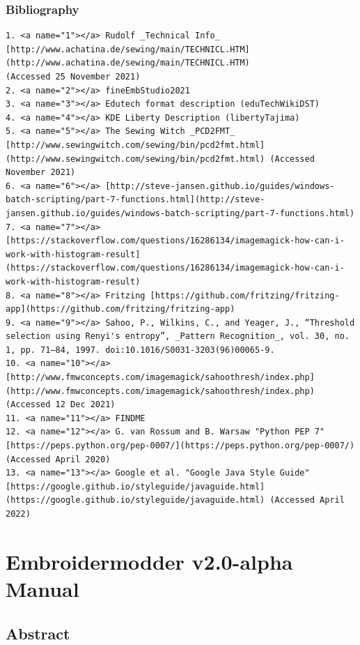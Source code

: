 \documentclass[a4paper, 11pt]{report}
\begin{document}
\subsection{Bibliography}

\begin{verbatim}
1. <a name="1"></a> Rudolf _Technical Info_ [http://www.achatina.de/sewing/main/TECHNICL.HTM](http://www.achatina.de/sewing/main/TECHNICL.HTM)
(Accessed 25 November 2021)
2. <a name="2"></a> fineEmbStudio2021
3. <a name="3"></a> Edutech format description (eduTechWikiDST)
4. <a name="4"></a> KDE Liberty Description (libertyTajima)
5. <a name="5"></a> The Sewing Witch _PCD2FMT_ [http://www.sewingwitch.com/sewing/bin/pcd2fmt.html](http://www.sewingwitch.com/sewing/bin/pcd2fmt.html) (Accessed November 2021)
6. <a name="6"></a> [http://steve-jansen.github.io/guides/windows-batch-scripting/part-7-functions.html](http://steve-jansen.github.io/guides/windows-batch-scripting/part-7-functions.html)
7. <a name="7"></a> [https://stackoverflow.com/questions/16286134/imagemagick-how-can-i-work-with-histogram-result](https://stackoverflow.com/questions/16286134/imagemagick-how-can-i-work-with-histogram-result)
8. <a name="8"></a> Fritzing [https://github.com/fritzing/fritzing-app](https://github.com/fritzing/fritzing-app)
9. <a name="9"></a> Sahoo, P., Wilkins, C., and Yeager, J., “Threshold selection using Renyi's entropy”, _Pattern Recognition_, vol. 30, no. 1, pp. 71–84, 1997. doi:10.1016/S0031-3203(96)00065-9.
10. <a name="10"></a> [http://www.fmwconcepts.com/imagemagick/sahoothresh/index.php](http://www.fmwconcepts.com/imagemagick/sahoothresh/index.php) (Accessed 12 Dec 2021)
11. <a name="11"></a> FINDME
12. <a name="12"></a> G. van Rossum and B. Warsaw "Python PEP 7" [https://peps.python.org/pep-0007/](https://peps.python.org/pep-0007/) (Accessed April 2020)
13. <a name="13"></a> Google et al. "Google Java Style Guide" [https://google.github.io/styleguide/javaguide.html](https://google.github.io/styleguide/javaguide.html) (Accessed April 2022)
\end{verbatim}

\chapter{Embroidermodder v2.0-alpha Manual}

\section{Abstract}
\end{document}
